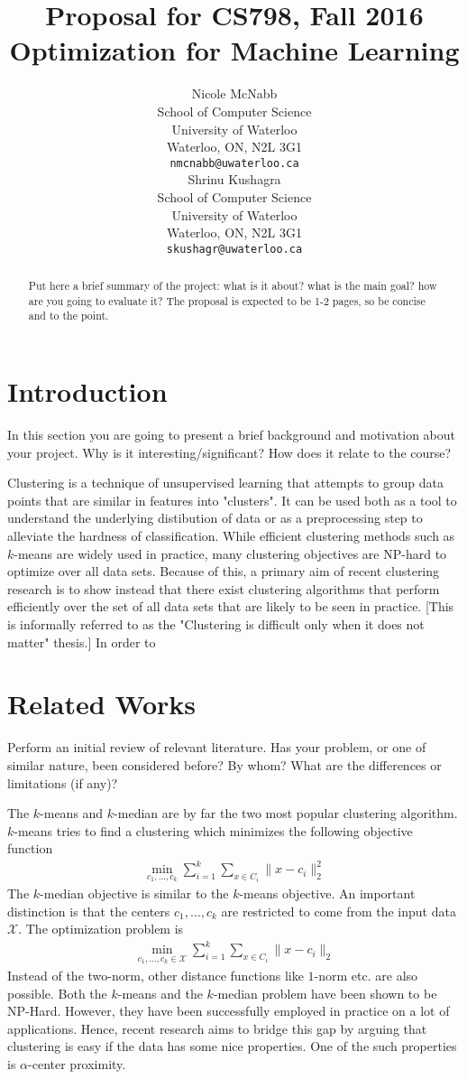 \documentclass{article}
\title{Proposal for CS798, Fall 2016\\ \large Optimization for Machine Learning}
\author{
	Nicole McNabb \\
	School of Computer Science\\
	University of Waterloo\\
	Waterloo, ON, N2L 3G1 \\
	\texttt{nmcnabb@uwaterloo.ca} \\
	\And
	Shrinu Kushagra\\
	School of Computer Science\\
	University of Waterloo\\
	Waterloo, ON, N2L 3G1 \\
	\texttt{skushagr@uwaterloo.ca} \\	
}
\newcommand{\mc}{\mathcal}
\begin{document}
\maketitle

\begin{abstract} 
Put here a brief summary of the project: what is it about? what is the main goal? how are you going to evaluate it? The proposal is expected to be 1-2 pages, so be concise and to the point.
\end{abstract} 

\section{Introduction}
In this section you are going to present a brief background and motivation about your project. Why is it interesting/significant? How does it relate to the course?

Clustering is a technique of unsupervised learning that attempts to group data points that are similar in features into "clusters". It can be used both as a tool to understand the underlying distibution of data or as a preprocessing step to alleviate the hardness of classification. While efficient clustering methods such as $k$-means are widely used in practice, many clustering objectives are NP-hard to optimize over all data sets. Because of this, a primary aim of recent clustering research is to show instead that there exist  clustering algorithms that perform efficiently over the set of all data sets that are likely to be seen in practice. [This is informally referred to as the "Clustering is difficult only when it does not matter" thesis.] In order to 

\section{Related Works}
Perform an initial review of relevant literature. Has your problem, or one of similar nature, been considered before? By whom? What are the differences or limitations (if any)? 

The $k$-means and $k$-median are by far the two most popular clustering algorithm. $k$-means tries to find a clustering which minimizes the following objective function
\begin{align*}
	\min_{c_1, \ldots, c_k} \sum_{i=1}^k \sum_{x \in C_i} \|x-c_i\|_2^2 
\end{align*}
The $k$-median objective is similar to the $k$-means objective. An important distinction is that the centers $c_1, \ldots, c_k$ are restricted to come from the input data $\mc X$. The optimization problem is
\begin{align*}
	\min_{c_1, \ldots, c_k \in \mc X} \sum_{i=1}^k \sum_{x \in C_i} \|x-c_i\|_2 
\end{align*}
Instead of the two-norm, other distance functions like $1$-norm etc. are also possible. Both the $k$-means and the $k$-median problem have been shown to be NP-Hard. However, they have been successfully employed in practice on a lot of applications. Hence, recent research aims to bridge this gap by arguing that clustering is easy if the data has some nice properties. One of the such properties is $\alpha$-center proximity. 
\end{document}
